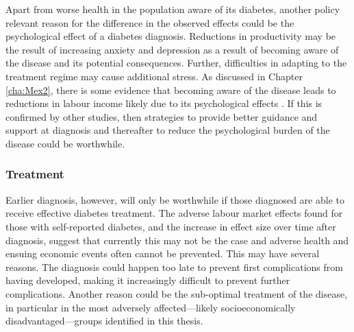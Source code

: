 Apart from worse health in the population aware of its diabetes, another policy relevant reason for the difference in the observed effects could be the psychological effect of a diabetes diagnosis. Reductions in productivity may be the result of increasing anxiety and depression as a result of becoming aware of the disease and its potential consequences. Further, difficulties in adapting to the treatment regime may cause additional stress. As discussed in Chapter \ref{cha:Mex2}, there is some evidence that becoming aware of the disease leads to reductions in labour income likely due to its psychological effects \parencite{Liu2014}. If this is confirmed by other studies, then strategies to provide better guidance and support at diagnosis and thereafter to reduce the psychological burden of the disease could be worthwhile.



\subsubsection{Treatment}

Earlier diagnosis, however, will only be worthwhile if those diagnosed are able to receive effective diabetes treatment. The adverse labour market effects found for those with self-reported diabetes, and the increase in effect size over time after diagnosis, suggest that currently this may not be the case and adverse health and ensuing economic events often cannot be prevented. This may have several reasons. The diagnosis could happen too late to prevent first complications from having developed, making it increasingly difficult to prevent further complications. Another reason could be the sub-optimal treatment of the disease, in particular in the most adversely affected---likely socioeconomically disadvantaged---groups identified in this thesis.


